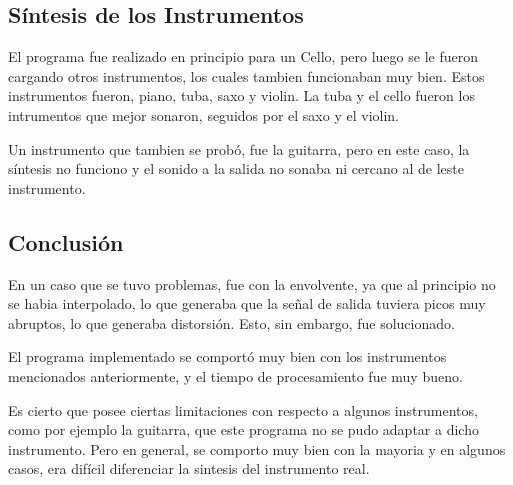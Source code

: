 \documentclass[../ASSD_TP2.tex]{subfiles}
\begin{document}
\subsection*{S\'intesis de los Instrumentos}
El programa fue realizado en principio para un Cello, pero luego se le fueron cargando otros instrumentos, los cuales tambien funcionaban muy bien. Estos instrumentos fueron, piano, tuba, saxo y violin. La tuba y el cello fueron los intrumentos que mejor sonaron, seguidos por el saxo y el violin.

Un instrumento que tambien se prob\'o, fue la guitarra, pero en este caso, la s\'intesis no funciono y el sonido a la salida no sonaba ni cercano al de leste instrumento.

\subsection*{Conclusi\'on}
En un caso que se tuvo problemas, fue con la envolvente, ya que al principio no se habia interpolado, lo que generaba que la señal de salida tuviera picos muy abruptos, lo que generaba distorsi\'on. Esto, sin embargo, fue solucionado.

El programa implementado se comport\'o muy bien con los instrumentos mencionados anteriormente, y el tiempo de procesamiento fue muy bueno.

 Es cierto que posee ciertas limitaciones con respecto a algunos instrumentos, como por ejemplo la guitarra, que este programa no se pudo adaptar a dicho instrumento. Pero en general, se comporto muy bien con la mayoria y en algunos casos, era dif\'icil diferenciar la sintesis del instrumento real.
 
\end{document}

